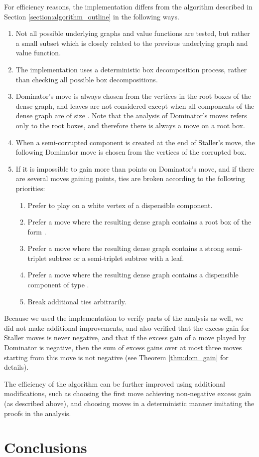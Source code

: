 \documentclass[11pt]{article}
\def\dnsitem{\vspace{-7pt}\item}
\theoremstyle{definition}
\begin{document}
For efficiency reasons, the implementation differs from the algorithm described in Section \ref{section:algorithm_outline} in the following ways.
\begin{enumerate}
	\dnsitem Not all possible underlying graphs and value functions are tested, but rather a small subset which is closely related to the previous underlying graph and value function.
	\dnsitem The implementation uses a deterministic box decomposition process, rather than checking all possible box decompositions. 
	\dnsitem Dominator's move is always chosen from the vertices in the root boxes of the dense graph, and leaves are not considered except when all components of the dense graph are of size .
	Note that the analysis of Dominator's moves refers only to the root boxes, and therefore there is always a move on a root box.
	\dnsitem When a semi-corrupted component is created at the end of Staller's move, the following Dominator move is chosen from the vertices of the corrupted box.
	\dnsitem If it is impossible to gain more than  points on Dominator's move, and if there are several moves gaining  points, ties are broken according to the following priorities:
	\begin{enumerate}
		\dnsitem Prefer to play on a white vertex of a dispensible component.
		\dnsitem Prefer a move where the resulting dense graph contains a root box of the form .
		\dnsitem Prefer a move where the resulting dense graph contains a strong semi-triplet subtree or a semi-triplet subtree with a  leaf.
		\dnsitem Prefer a move where the resulting dense graph contains a dispensible component of type . 
		\dnsitem Break additional ties arbitrarily.
	\end{enumerate}
\end{enumerate}

Because we used the implementation to verify parts of the analysis as well, we did not make additional improvements, and also verified that the excess gain for Staller moves is never negative, 
and that if the excess gain of a move played by Dominator is negative, then the sum of excess gains over at most three moves starting from this move is not negative (see Theorem \ref{thm:dom_gain} for details).

The efficiency of the algorithm can be further improved using additional modifications, such as choosing the first move achieving non-negative excess gain (as described above), 
and choosing moves in a deterministic manner imitating the proofs in the analysis.


\section{Conclusions}
\label{section:conclusions}
\end{document}
